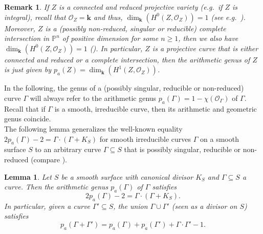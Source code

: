 \documentclass[english,11pt,reqno]{amsart}
\newcommand{\sub}{\subseteq}
\newcommand{\Pn}{\mathbb{P}^n}
\newcommand{\kk}{\mathbf{k}}
\newtheorem{rmk}[thm]{Remark}
\newtheorem{lem}[thm]{Lemma}
\begin{document}
	\begin{rmk} \label{rmk:genus_H1}
		If $Z$ is a connected and reduced projective variety (e.g.\ if $Z$ is integral), recall that $\mathcal{O}_Z=\kk$ and thus, $\dim_{\kk}(H^0(Z, \mathcal{O}_Z))=1$ (see e.g.\ \cite[Cor.\ 3.3.21]{Qing_Liu-Algebraic_Geometry}). Moreover, $Z$ is a (possibly non-reduced, singular or reducible) complete intersection in $\Pn$ of positive dimension for some $n\geq 1$, then we also have $\dim_{\kk}(H^0(Z, \mathcal{O}_Z))=1$ (\cite[18.6.U]{Rising_Sea-Vakil}). In particular, $Z$ is a projective curve that is either connected and reduced or a complete intersection, then the arithmetic genus of $Z$ is just given by $p_a(Z)=\dim_{\kk}(H^1(Z, \mathcal{O}_Z))$.
	\end{rmk}
	In the following, the genus of a (possibly singular, reducible or non-reduced) curve $\Gamma$ will always refer to the arithmetic genus $p_a(\Gamma)=1-\chi(\mathcal{O}_{\Gamma})$ of $\Gamma$. Recall that if $\Gamma$ is a smooth, irreducible curve, then its arithmetic and geometric genus coincide.\\
	The following lemma generalizes the well-known equality $2p_a(\Gamma)-2=\Gamma \cdot (\Gamma + K_S)$ for smooth irreducible curves $\Gamma$ on a smooth surface $S$ to an arbitrary curve $\Gamma \sub S$ that is possibly singular, reducible or non-reduced (compare \cite[Exercice V.1.3]{Hartshorne}).
	\begin{lem} \label{lem:genus_formula_union_of_curves}
		Let $S$ be a smooth surface with canonical divisor $K_S$ and $\Gamma \sub S$ a curve. Then the arithmetic genus $p_a(\Gamma)$ of $\Gamma$ satisfies 
		$$ 2p_a(\Gamma)-2 = \Gamma \cdot (\Gamma + K_S).$$
		In particular, given a curve $\Gamma'\sub S$, the union $\Gamma \cup \Gamma'$ (seen as a divisor on $S$) satisfies
		$$ p_a(\Gamma + \Gamma')= p_a(\Gamma)+p_a(\Gamma')+\Gamma\cdot \Gamma'-1.$$
	\end{lem}
\end{document}
